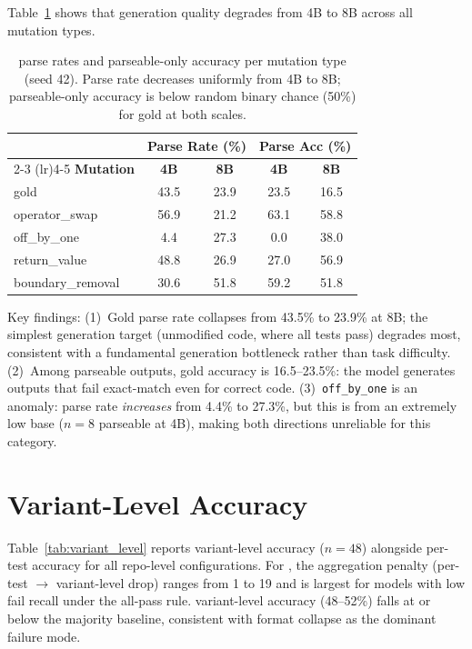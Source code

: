 Table~\ref{tab:cwm_mutation_parse} shows that \cwm{} generation quality degrades from 4B to 8B across all mutation types.

\begin{table}[h]
\centering
\small
\caption{\cwm{} parse rates and parseable-only accuracy per mutation type (seed 42). Parse rate decreases uniformly from 4B to 8B; parseable-only accuracy is below random binary chance (50\%) for gold at both scales.}
\label{tab:cwm_mutation_parse}
\setlength{\tabcolsep}{4pt}
\begin{tabular}{lcccc}
\toprule
& \multicolumn{2}{c}{\textbf{Parse Rate (\%)}} & \multicolumn{2}{c}{\textbf{Parse Acc (\%)}} \\
\cmidrule(lr){2-3} \cmidrule(lr){4-5}
\textbf{Mutation} & \textbf{4B} & \textbf{8B} & \textbf{4B} & \textbf{8B} \\
\midrule
gold & 43.5 & 23.9 & 23.5 & 16.5 \\
operator\_swap & 56.9 & 21.2 & 63.1 & 58.8 \\
off\_by\_one & 4.4 & 27.3 & 0.0 & 38.0 \\
return\_value & 48.8 & 26.9 & 27.0 & 56.9 \\
boundary\_removal & 30.6 & 51.8 & 59.2 & 51.8 \\
\bottomrule
\end{tabular}
\end{table}

Key findings: (1)~Gold parse rate collapses from 43.5\% to 23.9\% at 8B; the simplest generation target (unmodified code, where all tests pass) degrades most, consistent with a fundamental generation bottleneck rather than task difficulty. (2)~Among parseable outputs, gold accuracy is 16.5--23.5\%: the model generates outputs that fail exact-match even for correct code. (3)~\texttt{off\_by\_one} is an anomaly: parse rate \emph{increases} from 4.4\% to 27.3\%, but this is from an extremely low base ($n{=}8$ parseable at 4B), making both directions unreliable for this category.

\section{Variant-Level Accuracy}
\label{app:variant_level}

Table~\ref{tab:variant_level} reports variant-level accuracy ($n{=}48$) alongside per-test accuracy for all repo-level configurations. For \cls{}, the aggregation penalty (per-test $\to$ variant-level drop) ranges from 1\pp{} to 19\pp{} and is largest for models with low fail recall under the all-pass rule. \cwm{} variant-level accuracy (48--52\%) falls at or below the majority baseline, consistent with format collapse as the dominant failure mode.

